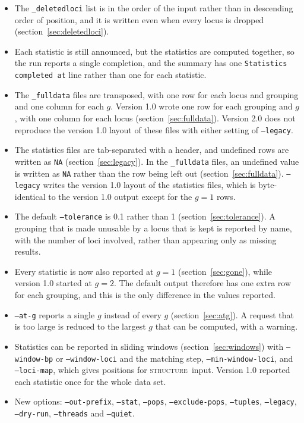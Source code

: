 \documentclass[11pt]{article}
\newcommand{\structureprog}{\textsc{structure}}
\newcommand{\flag}[1]{\texttt{#1}}
\begin{document}
\begin{itemize}[leftmargin=1.2em]
\item The \texttt{\_deletedloci} list is in the order of the input rather than
  in descending order of position, and it is written even when every locus is
  dropped (section~\ref{sec:deletedloci}).
\item Each statistic is still announced, but the statistics are computed
  together, so the run reports a single completion, and the summary has one
  \texttt{Statistics completed at} line rather than one for each statistic.
\item The \texttt{\_fulldata} files are transposed, with one row for each
  locus and grouping and one column for each $g$. Version 1.0 wrote one row for
  each grouping and $g$, with one column for each locus
  (section~\ref{sec:fulldata}). Version 2.0 does not reproduce the version 1.0
  layout of these files with either setting of \flag{--legacy}.
\item The statistics files are tab-separated with a header, and undefined rows
  are written as \texttt{NA} (section~\ref{sec:legacy}). In the
  \texttt{\_fulldata} files, an undefined value is written as \texttt{NA}
  rather than the row being left out (section~\ref{sec:fulldata}).
  \flag{--legacy} writes the version 1.0 layout of the statistics files, which
  is byte-identical to the version 1.0 output except for the $g = 1$ rows.
\item The default \flag{--tolerance} is 0.1 rather than 1
  (section~\ref{sec:tolerance}). A grouping that is made unusable by a locus
  that is kept is reported by name, with the number of loci involved, rather
  than appearing only as missing results.
\item Every statistic is now also reported at $g = 1$
  (section~\ref{sec:gone}), while version 1.0 started at $g = 2$. The default
  output therefore has one extra row for each grouping, and this is the only
  difference in the values reported.
\item \flag{--at-g} reports a single $g$ instead of every $g$
  (section~\ref{sec:atg}). A request that is too large is reduced to the
  largest $g$ that can be computed, with a warning.
\item Statistics can be reported in sliding windows (section~\ref{sec:windows})
  with \flag{--window-bp} or \flag{--window-loci} and the matching step,
  \flag{--min-window-loci}, and \flag{--loci-map}, which gives positions for
  \structureprog\ input. Version 1.0 reported each statistic once for the
  whole data set.
\item New options: \flag{--out-prefix}, \flag{--stat}, \flag{--pops},
  \flag{--exclude-pops}, \flag{--tuples}, \flag{--legacy}, \flag{--dry-run},
  \flag{--threads} and \flag{--quiet}.
\end{itemize}
\end{document}
